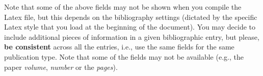 \begin{remark}
Note that some of the above fields may not be shown when you compile the Latex file, but this depends on the bibliography settings (dictated by the specific Latex style that you load at the beginning of the document). You may decide to include additional pieces of information in a given bibliographic entry, but please, \textbf{be consistent} across all the entries, i.e., use the same fields for the same publication type. Note that some of the fields may not be available (e.g., the paper {\it volume}, {\it number} or the {\it pages}).
\end{remark}